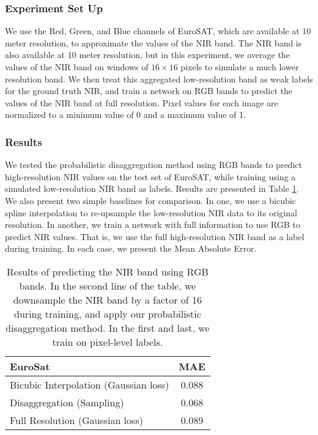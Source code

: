 \documentclass[10pt,twocolumn,letterpaper]{article}
\begin{document}
\subsubsection{Experiment Set Up}
We use the Red, Green, and Blue channels of EuroSAT, which are available at 10 meter resolution, to approximate the values of the NIR band. The NIR band is also available at 10 meter resolution, but in this experiment, we average the values of the NIR band on windows of $16 \times 16$ pixels to simulate a much lower resolution band. We then treat this aggregated low-resolution band as weak labels for the ground truth NIR, and train a network on RGB bands to predict the values of the NIR band at full resolution. Pixel values for each image are normalized to a minimum value of 0 and a maximum value of 1.

\subsubsection{Results}
We tested the probabilistic disaggregation method using RGB bands to predict high-resolution NIR values on the test set of EuroSAT, while training using a simulated low-resolution NIR band as labels. Results are presented in Table \ref{tab:eurosat}. We also present two simple baselines for comparison. In one, we use a bicubic spline interpolation to re-upsample the low-resolution NIR data to its original resolution. In another, we train a network with full information to use RGB to predict NIR values. That is, we use the full high-resolution NIR band as a label during training. In each case, we present the Mean Absolute Error.


\begin{table}[ht]
\centering
 \begin{tabular}{||p{3cm} | c||} 
 \hline
 {\bf EuroSat}  & MAE \\ 
 \hline\hline
 Bicubic Interpolation \newline (Gaussian loss) & 0.088\\ 
 \hline
 Disaggregation \newline (Sampling) & 0.068\\
 \hline
 Full Resolution \newline (Gaussian loss) & 0.089\\
 \hline
\end{tabular}
\caption{Results of predicting the NIR band using RGB bands. In the second line of the table, we downsample the NIR band by a factor of 16 during training, and apply our probabilistic disaggregation method. In the first and last, we train on pixel-level labels.}
\label{tab:eurosat}
\end{table}
\end{document}
